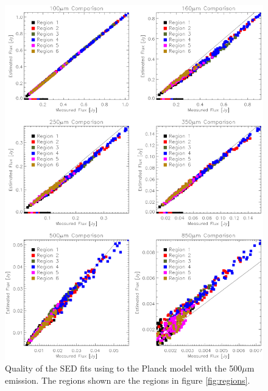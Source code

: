 \begin{figure}
  \centering
  \includegraphics[width=1.\textwidth]{sed_imgs/flux_compare_1_5.eps}
  \caption[Planck Model SED Fit Quality Using 500$\mu$m Data]{Quality of the SED fits using to the Planck model with the 500$\mu$m emission.  The regions shown are the regions in figure \ref{fig:regions}.}
  \label{fig:w1_5}
\end{figure}

